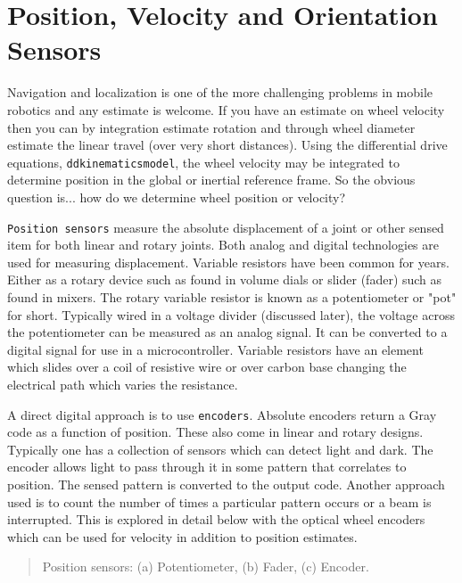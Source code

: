 \hypertarget{position-velocity-and-orientation-sensors}{%
\section{Position, Velocity and Orientation
Sensors}\label{position-velocity-and-orientation-sensors}}

Navigation and localization is one of the more challenging problems in
mobile robotics and any estimate is welcome. If you have an estimate on
wheel velocity then you can by integration estimate rotation and through
wheel diameter estimate the linear travel (over very short distances).
Using the differential drive equations, \texttt{ddkinematicsmodel}, the
wheel velocity may be integrated to determine position in the global or
inertial reference frame. So the obvious question is... how do we
determine wheel position or velocity?

\texttt{Position\ sensors} measure the absolute displacement of a joint
or other sensed item for both linear and rotary joints. Both analog and
digital technologies are used for measuring displacement. Variable
resistors have been common for years. Either as a rotary device such as
found in volume dials or slider (fader) such as found in mixers. The
rotary variable resistor is known as a potentiometer or "pot" for short.
Typically wired in a voltage divider (discussed later), the voltage
across the potentiometer can be measured as an analog signal. It can be
converted to a digital signal for use in a microcontroller. Variable
resistors have an element which slides over a coil of resistive wire or
over carbon base changing the electrical path which varies the
resistance.

A direct digital approach is to use \texttt{encoders}. Absolute encoders
return a Gray code as a function of position. These also come in linear
and rotary designs. Typically one has a collection of sensors which can
detect light and dark. The encoder allows light to pass through it in
some pattern that correlates to position. The sensed pattern is
converted to the output code. Another approach used is to count the
number of times a particular pattern occurs or a beam is interrupted.
This is explored in detail below with the optical wheel encoders which
can be used for velocity in addition to position estimates.

\begin{quote}
Position sensors: (a) Potentiometer, (b) Fader, (c) Encoder.
\end{quote}

